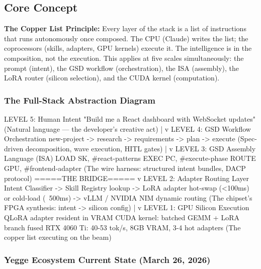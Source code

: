 \documentclass[11pt,letterpaper]{article}
\begin{document}
\subsection{Core Concept}

\textbf{The Copper List Principle:} Every layer of the stack is a list of instructions that runs autonomously once composed. The CPU (Claude) writes the list; the coprocessors (skills, adapters, GPU kernels) execute it. The intelligence is in the composition, not the execution. This applies at five scales simultaneously: the prompt (intent), the GSD workflow (orchestration), the ISA (assembly), the LoRA router (silicon selection), and the CUDA kernel (computation).

\subsubsection{The Full-Stack Abstraction Diagram}

\begin{asciibox}
LEVEL 5: Human Intent
  "Build me a React dashboard with WebSocket updates"
  (Natural language --- the developer's creative act)
        |
        v
LEVEL 4: GSD Workflow Orchestration
  new-project -> research -> requirements -> plan -> execute
  (Spec-driven decomposition, wave execution, HITL gates)
        |
        v
LEVEL 3: GSD Assembly Language (ISA)
  LOAD SK, #react-patterns
  EXEC PC, #execute-phase
  ROUTE GPU, #frontend-adapter
  (The wire harness: structured intent bundles, DACP protocol)
        =====THE BRIDGE=====
        v
LEVEL 2: Adapter Routing Layer
  Intent Classifier -> Skill Registry lookup
  -> LoRA adapter hot-swap (<100ms) or cold-load (~500ms)
  -> vLLM / NVIDIA NIM dynamic routing
  (The chipset's FPGA synthesis: intent -> silicon config)
        |
        v
LEVEL 1: GPU Silicon Execution
  QLoRA adapter resident in VRAM
  CUDA kernel: batched GEMM + LoRA branch fused
  RTX 4060 Ti: 40-53 tok/s, 8GB VRAM, 3-4 hot adapters
  (The copper list executing on the beam)
\end{asciibox}

\subsubsection{Yegge Ecosystem Current State (March 26, 2026)}
\end{document}

